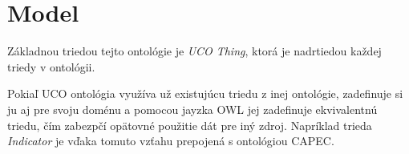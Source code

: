 \documentclass[12pt, a4paper, oneside]{book}
\begin{document}
\section{Model}

Základnou triedou tejto ontológie je \textit{UCO Thing}, ktorá je nadrtiedou každej triedy v ontológii.


Pokiaľ UCO ontológia využíva už existujúcu triedu z inej ontológie, zadefinuje si ju aj pre svoju doménu a pomocou jayzka OWL jej zadefinuje ekvivalentnú triedu, čím zabezpčí opätovné použitie dát pre iný zdroj. Napríklad trieda \textit{Indicator} je vďaka tomuto vzťahu prepojená s ontológiou CAPEC.

\end{document}
